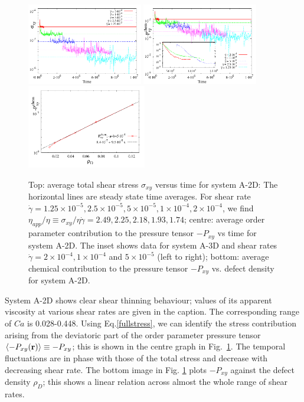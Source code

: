 \documentclass[8.5pt,twoside,twocolumn]{article}
\newcommand{\e}[1]{\times10^{#1}}
\begin{document}
\begin{figure}[htp!]
\centering
\includegraphics[angle=0,width=0.45\textwidth]{S_xy_tot_t_5e-4.pdf}
\includegraphics[angle=0,width=0.45\textwidth]{P_xy_chem_t_5e-4.pdf}
\includegraphics[angle=0,width=0.465\textwidth]{P_xy_defect_density.pdf}
\caption{Top: average total shear stress $\sigma_{xy}$ versus time for system A-2D: The horizontal lines are steady state time averages. For shear rate $\dot{\gamma}=1.25\e{-5}, 2.5\e{-5}, 5\e{-5}, 1\e{-4}, 2\e{-4}$, we find $\eta_{app}/\eta\equiv\sigma_{xy}/ \eta \dot{\gamma}=2.49, 2.25, 2.18, 1.93, 1.74$; centre: average order parameter contribution to the pressure tensor $-P_{xy}$ vs time for system A-2D. The inset shows data for system A-3D and shear rates $\dot{\gamma}=2\times10^{-4}, 1\times10^{-4}$ and $5\times10^{-5}$ (left to right); bottom: average chemical contribution to the pressure tensor $-P_{xy}$ vs. defect density for system A-2D.}
\label{fig7}
\end{figure}


System A-2D shows clear shear thinning behaviour; values of its apparent viscosity at various shear rates are given in the caption. The corresponding range of $Ca$ is 0.028-0.448. Using Eq.\ref{fullstress}, we can identify the stress contribution arising from the deviatoric part of the order parameter pressure tensor
$\langle - P_{xy}({\bf r})\rangle\equiv - P_{xy}$; this is shown in the centre graph in Fig.~\ref{fig7}. The temporal fluctuations are in phase with those of the total stress and decrease with decreasing shear rate.
The bottom image in Fig. \ref{fig7} plots $- P_{xy}$ against the defect density $\rho_D$; this shows a linear relation across almost the whole range of shear rates.
\end{document}
